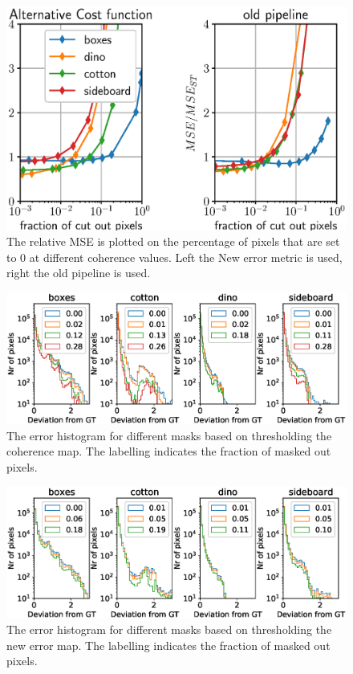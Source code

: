 \documentclass  [
  paper    = a4,
  BCOR     = 10mm,
  twoside,
  fontsize = 12pt,
  fleqn,
  toc      = bibnumbered,
  toc      = listofnumbered,
  numbers  = noendperiod,
  headings = normal,
  listof   = leveldown,
  version  = 3.03
]                                       {scrreprt}
\begin{document}
\begin{figure}
	\centering
	\includegraphics[width=1\linewidth]{images/newerror_confidence}
	\caption[Dependence of error on cut out pixels]{The relative MSE is plotted on the percentage of pixels that are set to 0 at different coherence values. Left the New error metric is used, right the old pipeline is used.}
	\label{fig:newerrorconfidence}
\end{figure}



\begin{figure}
	\centering
	\includegraphics[width=1\linewidth]{images/histogram_error_mask_old}
	\caption[Histogram when masking errors]{The error histogram for different masks based on thresholding the coherence map. The labelling indicates the fraction of masked out pixels.}
	\label{fig:histogramerrormaskold}
\end{figure}

\begin{figure}
	\centering
	\includegraphics[width=1\linewidth]{images/histogram_error_mask_new_err}
	\caption[Histogram when masking errors with new error map]{The error histogram for different masks based on thresholding the new error map. The labelling indicates the fraction of masked out pixels.}
	\label{fig:histogramerrormasknewerr}
\end{figure}
\end{document}
